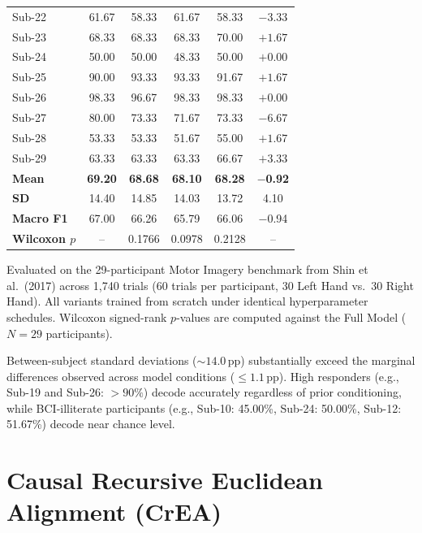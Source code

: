 \documentclass[journal]{IEEEtran}
\begin{document}
\begin{table}[!htbp]
{\begin{tabular}{@{}lccccc@{}}
Sub-22 & 61.67 & 58.33 & 61.67 & 58.33 & $-3.33$ \\
Sub-23 & 68.33 & 68.33 & 68.33 & 70.00 & $+1.67$ \\
Sub-24 & 50.00 & 50.00 & 48.33 & 50.00 & $+0.00$ \\
Sub-25 & 90.00 & 93.33 & 93.33 & 91.67 & $+1.67$ \\
Sub-26 & 98.33 & 96.67 & 98.33 & 98.33 & $+0.00$ \\
Sub-27 & 80.00 & 73.33 & 71.67 & 73.33 & $-6.67$ \\
Sub-28 & 53.33 & 53.33 & 51.67 & 55.00 & $+1.67$ \\
Sub-29 & 63.33 & 63.33 & 63.33 & 66.67 & $+3.33$ \\
\midrule
\textbf{Mean} & \textbf{69.20} & \textbf{68.68} & \textbf{68.10} & \textbf{68.28} & \textbf{$-$0.92} \\
\textbf{SD} & 14.40 & 14.85 & 14.03 & 13.72 & 4.10 \\
\textbf{Macro F1} & 67.00 & 66.26 & 65.79 & 66.06 & $-$0.94 \\
\textbf{Wilcoxon $p$} & -- & 0.1766 & 0.0978 & 0.2128 & -- \\
\bottomrule
\end{tabular}%
}
\par\smallskip
{\scriptsize Evaluated on the 29-participant Motor Imagery benchmark from Shin et al.\ (2017) \cite{shin2017open} across 1,740 trials (60 trials per participant, 30 Left Hand vs.\ 30 Right Hand). All variants trained from scratch under identical hyperparameter schedules. Wilcoxon signed-rank $p$-values are computed against the Full Model ($N=29$ participants).}
\end{table}

Between-subject standard deviations ($\sim 14.0$\,pp) substantially exceed the marginal differences observed across model conditions ($\le 1.1$\,pp). High responders (e.g., Sub-19 and Sub-26: $>90\%$) decode accurately regardless of prior conditioning, while BCI-illiterate participants (e.g., Sub-10: 45.00\%, Sub-24: 50.00\%, Sub-12: 51.67\%) decode near chance level.

\section{Causal Recursive Euclidean Alignment (CrEA)}
\label{sec:supp_crea}
\end{document}
